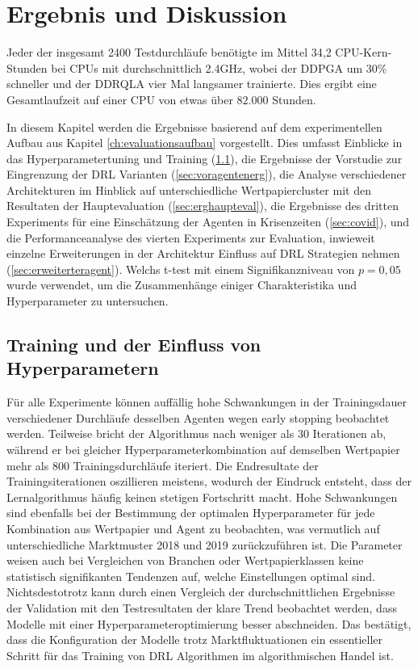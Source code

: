 \chapter{Ergebnis und Diskussion}
\label{ch:ergebnis}

Jeder der insgesamt 2400 Testdurchläufe benötigte im Mittel 34,2 CPU-Kern-Stunden bei CPUs mit durchschnittlich 2.4GHz, wobei der \acs{DDPGA} um 30\% schneller und der \acs{DDRQLA} vier Mal langsamer trainierte. Dies ergibt eine Gesamtlaufzeit auf einer CPU von etwas über $82.000$ Stunden.

In diesem Kapitel werden die Ergebnisse basierend auf dem experimentellen Aufbau aus Kapitel \ref{ch:evaluationsaufbau} vorgestellt.
Dies umfasst Einblicke in das Hyperparametertuning und Training (\ref{sec:reshyp}), die Ergebnisse der Vorstudie zur Eingrenzung der \acs{DRL} Varianten (\ref{sec:voragentenerg}), die Analyse verschiedener Architekturen im Hinblick auf unterschiedliche Wertpapiercluster mit den Resultaten der Hauptevaluation (\ref{sec:erghaupteval}), die Ergebnisse des dritten Experiments für eine Einschätzung der Agenten in Krisenzeiten (\ref{sec:covid}), und die Performanceanalyse des vierten Experiments zur Evaluation, inwieweit einzelne Erweiterungen in der Architektur Einfluss auf \acs{DRL} Strategien nehmen (\ref{sec:erweiterteragent}).
Welchs t-test mit einem Signifikanzniveau von $p=0,05$ wurde verwendet, um die Zusammenhänge einiger Charakteristika und Hyperparameter zu untersuchen.

\section{Training und der Einfluss von Hyperparametern}
\label{sec:reshyp}

Für alle Experimente können auffällig hohe Schwankungen in der Trainingsdauer verschiedener Durchläufe desselben Agenten wegen early stopping beobachtet werden. 
Teilweise bricht der Algorithmus nach weniger als 30 Iterationen ab, während er bei gleicher Hyperparameterkombination auf demselben Wertpapier mehr als 800 Trainingsdurchläufe iteriert.
Die Endresultate der Trainingsiterationen oszillieren meistens, wodurch der Eindruck entsteht, dass der Lernalgorithmus häufig keinen stetigen Fortschritt macht.
Hohe Schwankungen sind ebenfalls bei der Bestimmung der optimalen Hyperparameter für jede Kombination aus Wertpapier und Agent zu beobachten,
was vermutlich auf unterschiedliche Marktmuster 2018 und 2019 zurückzuführen ist.
Die Parameter weisen auch bei Vergleichen von Branchen oder Wertpapierklassen keine statistisch signifikanten Tendenzen auf, welche Einstellungen optimal sind. Nichtsdestotrotz kann durch einen Vergleich der durchschnittlichen Ergebnisse der Validation mit den Testresultaten der klare Trend beobachtet werden, dass Modelle mit einer Hyperparameteroptimierung besser abschneiden.
Das bestätigt, dass die Konfiguration der Modelle trotz Marktfluktuationen ein essentieller Schritt für das Training von \acs{DRL} Algorithmen im algorithmischen Handel ist. 

